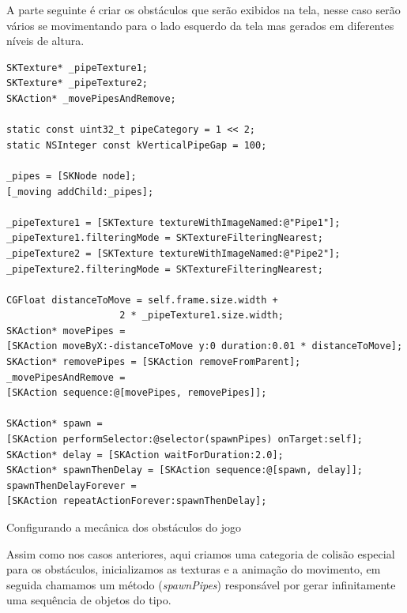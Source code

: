 \documentclass[a4paper,12pt,brazil,oneside]{book}
\begin{document}
A parte seguinte é criar os obstáculos que serão exibidos na tela, nesse caso serão vários se movimentando para o lado esquerdo da tela mas gerados em diferentes níveis de altura.

\begin{listing}[H]
\begin{verbatim}
SKTexture* _pipeTexture1;
SKTexture* _pipeTexture2;
SKAction* _movePipesAndRemove;
    
static const uint32_t pipeCategory = 1 << 2;
static NSInteger const kVerticalPipeGap = 100;

_pipes = [SKNode node];
[_moving addChild:_pipes];

_pipeTexture1 = [SKTexture textureWithImageNamed:@"Pipe1"];
_pipeTexture1.filteringMode = SKTextureFilteringNearest;
_pipeTexture2 = [SKTexture textureWithImageNamed:@"Pipe2"];
_pipeTexture2.filteringMode = SKTextureFilteringNearest;
        
CGFloat distanceToMove = self.frame.size.width + 
					2 * _pipeTexture1.size.width;
SKAction* movePipes = 
[SKAction moveByX:-distanceToMove y:0 duration:0.01 * distanceToMove];
SKAction* removePipes = [SKAction removeFromParent];
_movePipesAndRemove = 
[SKAction sequence:@[movePipes, removePipes]];
        
SKAction* spawn = 
[SKAction performSelector:@selector(spawnPipes) onTarget:self];
SKAction* delay = [SKAction waitForDuration:2.0];
SKAction* spawnThenDelay = [SKAction sequence:@[spawn, delay]];
spawnThenDelayForever = 
[SKAction repeatActionForever:spawnThenDelay];       
\end{verbatim}
\caption{Configurando a mecânica dos obstáculos do jogo}
\end{listing}

Assim como nos casos anteriores, aqui criamos uma categoria de colisão especial para os obstáculos, inicializamos as texturas e a animação do movimento, em seguida chamamos um método (\emph{spawnPipes}) responsável por gerar infinitamente uma sequência de objetos do tipo.
\end{document}
